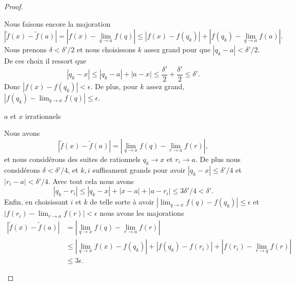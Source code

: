 \begin{proof}
\begin{subproof}
\begin{subproof}
                Nous faisons encore la majoration
                \begin{equation}
                    | \tilde f(x)-\tilde f(a) |=| f(x)-\lim_{q\to a} f(q) |\leq | f(x)-f(q_k) |+| f(q_k)-\lim_{q\to a} f(a) |.
                \end{equation}
                Nous prenons \( \delta<\delta'/2\) et nous choisissons \( k\) assez grand pour que \( | q_k-a |<\delta'/2\). De ces choix il ressort que
                \begin{equation}
                    | q_k-x |\leq | q_k-a |+| a-x |\leq \frac{ \delta' }{2}+\frac{ \delta' }{2}\leq \delta'.
                \end{equation}
                Donc \( | f(x)-f(q_k) |<\epsilon\). De plus, pour \( k\) assez grand, \( | f(q_k)-\lim_{q\to a} f(q) |\leq \epsilon\).

            \item[\( a\) et \( x\) irrationnels]

                Nous avons
                \begin{equation}
                    | \tilde f(x)-\tilde f(a) |=| \lim_{q\to x} f(q)-\lim_{r\to a} f(r) |,
                \end{equation}
                et nous considérons des suites de rationnels \( q_k\to x\) et \( r_i\to a\). De plus nous considérons \( \delta<\delta'/4\), et \( k,i\) suffisament grands pour avoir \( | q_k-x |\leq \delta'/4\) et \( | r_i-a |<\delta'/4\). Avec tout cela nous avons
                \begin{equation}
                    | q_k-r_i |\leq | q_k-x |+| x-a |+| a-r_i |\leq 3\delta'/4<\delta'.
                \end{equation}
                Enfin, en choisissant \( i\) et \( k\) de telle sorte à avoir \( | \lim_{q\to x} f(q)-f(q_k) |\leq \epsilon\) et \( | f(r_i)-\lim_{r\to a} f(r) |<\epsilon\) nous avons les majorations
                \begin{subequations}
                    \begin{align}
                        | \tilde f(x)-\tilde f(a) |&=| \lim_{q\to x} f(q)-\lim_{r\to a} f(r) |\\
                        &\leq | \lim_{q\to x} f(x)-f(q_k) |+| f(q_k)-f(r_i) |+| f(r_i)-\lim_{r\to q} f(r) |\\
                        &\leq 3\epsilon.
                    \end{align}
                \end{subequations}
        \end{subproof}

    \end{subproof}
\end{proof}

